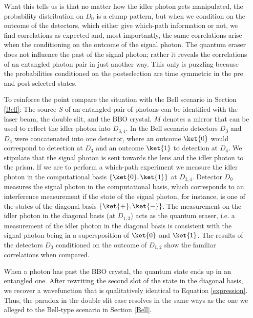 \documentclass[12pt]{article}
\numberwithin{equation}{section}
\begin{document}
What this tells us is that no matter how the idler photon gets manipulated, the probability distribution on $D_0$ is a clump pattern, but when we condition on the outcome of the detectors, which either give which-path information or not, we find correlations as expected and, most importantly, the same correlations arise when the conditioning on the outcome of the signal photon. The quantum eraser does not influence the past of the signal photon; rather it reveals the correlations of an entangled photon pair in just another way. This only is puzzling because the probabilities conditioned on the postselection are time symmetric in the pre and post selected states. 

To reinforce the point compare the situation with the Bell scenario in Section \ref{Bell}: The source $S$ of an entangled pair of photons can be identified with the laser beam, the double slit, and the BBO crystal. $M$ denotes a mirror that can be used to reflect the idler photon into $D_{3,4}$. In the Bell scenario detectors $D_3$ and $D_4$ were concatenated into one detector, where an outcome $\ket{0}$ would correspond to detection at $D_3$ and an outcome $\ket{1}$ to detection at $D_4$. We stipulate that the signal photon is sent towards the lens and the idler photon to the prism. If we are to perform a which-path experiment we measure the idler photon in the computational basis $\{\ket{0},\ket{1}\}$ at $D_{3,4}$. Detector $D_0$ measures the signal photon in the computational basis, which corresponds to an interference measurement if the state of the signal photon, for instance, is one of the states of the diagonal basis $\{\ket{+},\ket{-}\}$. The measurement on the idler photon in the diagonal basis (at $D_{1,2}$) acts as the quantum eraser, i.e. a measurement of the idler photon in the diagonal basis is consistent with the signal photon being in a supersposition of $\ket{0}$ and $\ket{1}$. The results of the detectors $D_0$ conditioned on the outcome of $D_{1,2}$ show the familiar correlations when compared. 

When a photon has past the BBO crystal, the quantum state ends up in an entangled one. After rewriting the second slot of the state in the diagonal basis, we recover a wavefunction that is qualitatively identical to Equation \ref{expression}. Thus, the paradox in the double slit case resolves in the same ways as the one we alleged to the Bell-type scenario in Section \ref{Bell}.

\end{document}
